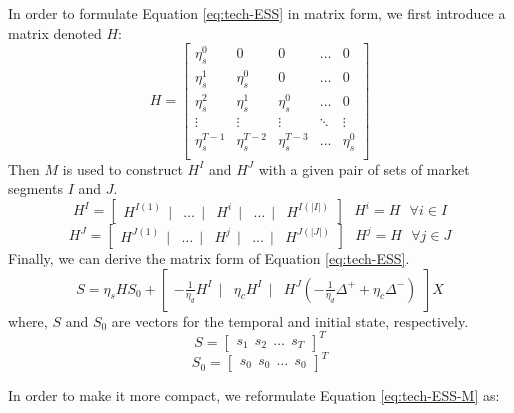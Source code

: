 In order to formulate Equation \eqref{eq:tech-ESS} in matrix form, we first introduce a matrix denoted $H$:
\[
H
=
\begin{bmatrix}
\eta_s^0 & 0 & 0 &  \dots & 0 \\
\eta_s^1 & \eta_s^0 & 0 &  \dots & 0 \\
\eta_s^2 & \eta_s^1 & \eta_s^0 &  \dots & 0 \\
\vdots & \vdots & \vdots &  \ddots & \vdots \\
\eta_s^{T-1} & \eta_s^{T-2} & \eta_s^{T-3} & \dots & \eta_s^0 \\
\end{bmatrix}
\]
\newline
Then $M$ is used to construct $H^I$ and $H^J$ with a given pair of sets of market segments $I$ and $J$.
\begin{equation*}
H^I = \begin{bmatrix}
H^{I(1)}~~|&\dots~~|&H^i~~|&\dots~~|&H^{I(|I|)}
\end{bmatrix}~~~
H^i = H ~~~ \forall i \in I
\end{equation*}
\begin{equation*}
H^J = \begin{bmatrix}
H^{J(1)}~~|&\dots~~|&H^j~~|&\dots~~|&H^{J(|J|)}
\end{bmatrix}~~~
H^j = H ~~~ \forall j \in J
\end{equation*}
Finally, we can derive the matrix form of Equation \eqref{eq:tech-ESS}.
\begin{equation}
\label{eq:tech-ESS-M}
S = \eta_s H S_0 + \begin{bmatrix}
-\frac{1}{\eta_d} H^I~~|& \eta_c H^I~~|& H^J (-\frac{1}{\eta_d} \Delta^{+} + \eta_c \Delta^{-})
\end{bmatrix} X
\end{equation}
where, $S$ and $S_0$ are vectors for the temporal and initial state, respectively.
\begin{equation*}
S = \begin{bmatrix}
s_1~~s_2~~\dots~~s_T
\end{bmatrix}^T
\end{equation*}
\begin{equation*}
S_0 = \begin{bmatrix}
s_0~~s_0~~\dots~~s_0
\end{bmatrix}^T
\end{equation*}

In order to make it more compact, we reformulate Equation \eqref{eq:tech-ESS-M} as:

